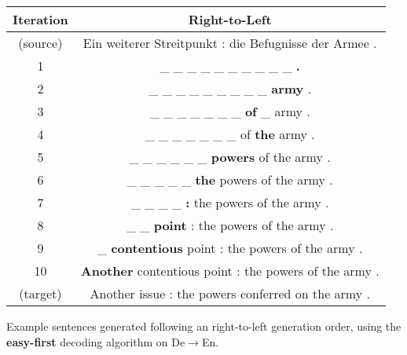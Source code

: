 \centering
\footnotesize
\begin{tabular}{cc}
\toprule
Iteration & {\color{blue} Right-to-Left} \\
\midrule
(source) & Ein weiterer Streitpunkt : die Befugnisse der Armee . \\
1 &  \_ \_ \_ \_ \_ \_ \_ \_ \_ \_ \textbf{.} \\ 
2 &  \_ \_ \_ \_ \_ \_ \_ \_ \_ \textbf{army} . \\ 
3 &  \_ \_ \_ \_ \_ \_ \_ \textbf{of} \_ army . \\ 
4 &  \_ \_ \_ \_ \_ \_ \_ of \textbf{the} army . \\ 
5 &  \_ \_ \_ \_ \_ \_ \textbf{powers} of the army . \\ 
6 &  \_ \_ \_ \_ \_ \textbf{the} powers of the army . \\ 
7 &  \_ \_ \_ \_ \textbf{:} the powers of the army . \\ 
8 &  \_ \_ \textbf{point} : the powers of the army . \\ 
9 &  \_ \textbf{contentious} point : the powers of the army . \\ 
10 & \textbf{Another} contentious point : the powers of the army . \\
(target) & Another issue : the powers conferred on the army . \\

\bottomrule
\end{tabular}

\caption{Example sentences generated following an {\color{blue} right-to-left} generation order, using the \textbf{easy-first} decoding algorithm on De$\rightarrow$En.}